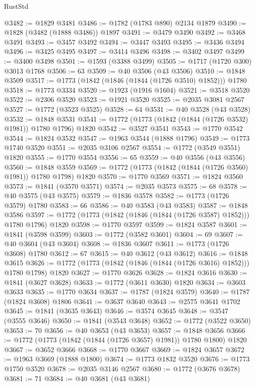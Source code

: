 \begin{lexlean}{RustStd}
\begin{coremodule}
@3482 := @1829 @3481
@3486 := @1782 (@1783 @890) @2134 @1879
@3490 := @1828 (@3482 (@1888 @3486)) @1897
@3491 := @3479 @3490
@3492 := @3468 @3491
@3493 := @3457 @3492
@3494 := @3447 @3493
@3495 := @3436 @3494
@3496 := @3425 @3495
@3497 := @3414 @3496
@3498 := @3402 @3497
@3499 := @3400 @3498
@3501 := @1593 (@3388 @3499)
@3505 := @1717 (@1720 @300) @3013 @1768
@3506 := 63
@3509 := @40 @3506 (@43 @3506)
@3510 := @1848 @3509
@3517 := @1773 (@1842 (@1846 (@1844 (@1726 @3510) @1852))) @1780
@3518 := @1773 @3334
@3520 := @1923 (@1916 @1604)
@3521 := @3518 @3520
@3522 := @2306 @3520
@3523 := @1921 @3520
@3525 := @2035 @3081 @2567
@3527 := @1772 (@3523 @3525)
@3528 := 64
@3531 := @40 @3528 (@43 @3528)
@3532 := @1848 @3531
@3541 := @1772 (@1773 (@1842 (@1844 (@1726 @3532) @1981)) @1780 @1796) @1820
@3542 := @3527 @3541
@3543 := @1770 @3542
@3544 := @1824 @3532
@3547 := @1963 @3544 (@1888 @1796)
@3549 := @1773 @1740 @3520
@3551 := @2035 @3106 @2567
@3554 := @1772 (@3549 @3551) @1820
@3555 := @1770 @3554
@3556 := 65
@3559 := @40 @3556 (@43 @3556)
@3560 := @1848 @3559
@3569 := @1772 (@1773 (@1842 (@1844 (@1726 @3560) @1981)) @1780 @1798) @1820
@3570 := @1770 @3569
@3571 := @1824 @3560
@3573 := @1841 (@3570 @3571)
@3574 := @2035 @3573
@3575 := 68
@3578 := @40 @3575 (@43 @3575)
@3579 := @1836 @3578
@3582 := @1773 (@1726 @3579) @1780
@3583 := 66
@3586 := @40 @3583 (@43 @3583)
@3587 := @1848 @3586
@3597 := @1772 (@1773 (@1842 (@1846 (@1844 (@1726 @3587) @1852))) @1780 @1796) @1820
@3598 := @1770 @3597
@3599 := @1824 @3587
@3601 := @1841 (@3598 @3599)
@3603 := @1772 (@3582 @3601)
@3604 := 69
@3607 := @40 @3604 (@43 @3604)
@3608 := @1836 @3607
@3611 := @1773 (@1726 @3608) @1780
@3612 := 67
@3615 := @40 @3612 (@43 @3612)
@3616 := @1848 @3615
@3626 := @1772 (@1773 (@1842 (@1846 (@1844 (@1726 @3616) @1852))) @1780 @1798) @1820
@3627 := @1770 @3626
@3628 := @1824 @3616
@3630 := @1841 (@3627 @3628)
@3633 := @1772 (@3611 @3630) @1820
@3634 := @3603 @3633
@3635 := @1770 @3634
@3637 := @1787 (@1824 @3579)
@3640 := @1787 (@1824 @3608) @1806
@3641 := @3637 @3640
@3643 := @2575 @3641 @1702
@3645 := @1841 (@3635 @3643)
@3646 := @3574 @3645
@3648 := @3547 (@3555 @3646)
@3650 := @1841 (@3543 @3648)
@3652 := @1772 (@3522 @3650)
@3653 := 70
@3656 := @40 @3653 (@43 @3653)
@3657 := @1848 @3656
@3666 := @1772 (@1773 (@1842 (@1844 (@1726 @3657) @1981)) @1780 @1800) @1820
@3667 := @3652 @3666
@3668 := @1770 @3667
@3669 := @1824 @3657
@3672 := @1963 @3669 (@1888 @1800)
@3674 := @1773 @1832 @3520
@3676 := @1773 @1750 @3520
@3678 := @2035 @3146 @2567
@3680 := @1772 (@3676 @3678)
@3681 := 71
@3684 := @40 @3681 (@43 @3681)

\end{coremodule}
\end{lexlean}
